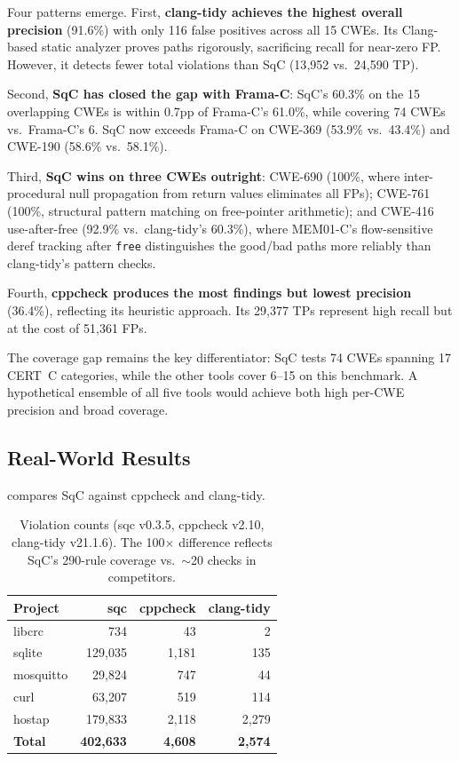 \documentclass[10pt,twocolumn,letterpaper]{article}
\begin{document}
Four patterns emerge.  First, \textbf{clang-tidy achieves the highest
overall precision} (91.6\%) with only 116 false positives across all
15 CWEs.  Its Clang-based static analyzer proves paths rigorously,
sacrificing recall for near-zero FP.  However, it detects fewer total
violations than SqC (13{,}952 vs.\ 24{,}590 TP).

Second, \textbf{SqC has closed the gap with Frama-C}: SqC's 60.3\%
on the 15 overlapping CWEs is within 0.7pp of Frama-C's 61.0\%, while
covering 74 CWEs vs.\ Frama-C's 6.  SqC now exceeds Frama-C on
CWE-369 (53.9\% vs.\ 43.4\%) and CWE-190 (58.6\% vs.\ 58.1\%).

Third, \textbf{SqC wins on three CWEs outright}: CWE-690 (100\%, where
inter-procedural null propagation from return values eliminates all FPs);
CWE-761 (100\%, structural pattern matching on free-pointer arithmetic);
and CWE-416 use-after-free (92.9\% vs.\ clang-tidy's 60.3\%), where
MEM01-C's flow-sensitive deref tracking after \texttt{free} distinguishes
the good/bad paths more reliably than clang-tidy's pattern checks.

Fourth, \textbf{cppcheck produces the most findings but lowest precision}
(36.4\%), reflecting its heuristic approach.  Its 29{,}377 TPs represent
high recall but at the cost of 51{,}361 FPs.

The coverage gap remains the key differentiator: SqC tests 74 CWEs
spanning 17 CERT~C categories, while the other tools cover 6--15 on
this benchmark.  A hypothetical ensemble of all five tools would
achieve both high per-CWE precision and broad coverage.

\subsection{Real-World Results}

 compares SqC against cppcheck and
clang-tidy.

\begin{table}[t]
\centering
\footnotesize
\begin{tabular}{@{}lrrr@{}}
\toprule
\textbf{Project} & \textbf{sqc} & \textbf{cppcheck} & \textbf{clang-tidy} \\
\midrule
libcrc & 734 & 43 & 2 \\
sqlite & 129,035 & 1,181 & 135 \\
mosquitto & 29,824 & 747 & 44 \\
curl & 63,207 & 519 & 114 \\
hostap & 179,833 & 2,118 & 2,279 \\
\midrule
\textbf{Total} & \textbf{402,633} & \textbf{4,608} & \textbf{2,574} \\
\bottomrule
\end{tabular}
\caption{Violation counts (sqc v0.3.5, cppcheck v2.10, clang-tidy
v21.1.6).  The 100$\times$ difference reflects SqC's 290-rule coverage
vs.~$\sim$20 checks in competitors.}
\label{tab:realworld-results}
\end{table}
\end{document}

